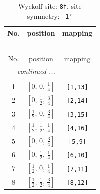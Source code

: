 \documentclass[fleqn,8pt]{jsarticle}
\begin{document}
\begin{longtable}{ccc}
\caption{Wyckoff site: {\tt 8f}, site symmetry: {\tt -1'}}
 \\
 \hline \hline
No. & position & mapping \\ \hline \endfirsthead

\multicolumn{2}{l}{\tablename\ \thetable{}} \\
 \hline \hline
No. & position & mapping \\ \hline \endhead

 \hline \hline
\multicolumn{2}{r}{\footnotesize\it continued ...} \\ \endfoot

 \hline \hline
\multicolumn{2}{r}{} \\ \endlastfoot

1 & $\left[ 0,\, 0,\, \frac{1}{4} \right]$ & {\tt [1,13]} \\ \hline
2 & $\left[ 0,\, \frac{1}{2},\, \frac{3}{4} \right]$ & {\tt [2,14]} \\ \hline
3 & $\left[ \frac{1}{2},\, 0,\, \frac{3}{4} \right]$ & {\tt [3,15]} \\ \hline
4 & $\left[ \frac{1}{2},\, \frac{1}{2},\, \frac{1}{4} \right]$ & {\tt [4,16]} \\ \hline
5 & $\left[ 0,\, 0,\, \frac{3}{4} \right]$ & {\tt [5,9]} \\ \hline
6 & $\left[ 0,\, \frac{1}{2},\, \frac{1}{4} \right]$ & {\tt [6,10]} \\ \hline
7 & $\left[ \frac{1}{2},\, 0,\, \frac{1}{4} \right]$ & {\tt [7,11]} \\ \hline
8 & $\left[ \frac{1}{2},\, \frac{1}{2},\, \frac{3}{4} \right]$ & {\tt [8,12]} \\
\end{longtable}
\renewcommand{\arraystretch}{1.2}
\end{document}
